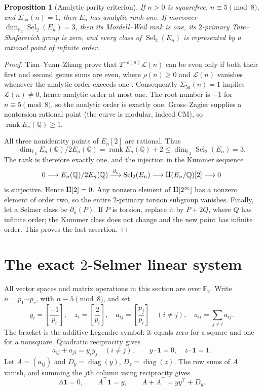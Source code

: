 \documentclass[11pt,a4paper]{article}
\newtheorem{proposition}[theorem]{Proposition}
\theoremstyle{definition}
\newcommand{\FF}{\mathbb F_2}
\newcommand{\QQ}{\mathbb Q}
\newcommand{\rank}{\operatorname{rank}}
\newcommand{\Sel}{\operatorname{Sel}_2}
\newcommand{\Sha}{\operatorname{\mathrlap{\mathchoice{\raisebox{.13ex}{$\displaystyle\amalg$}}{\raisebox{.13ex}{$\textstyle\amalg$}}{\amalg}{\amalg}}\amalg}}
\newcommand{\sgnbit}[2]{\left[\frac{#1}{#2}\right]}
\newcommand{\one}{\boldsymbol{1}}
\newcommand{\diag}{\operatorname{diag}}
\begin{document}
\begin{proposition}[Analytic parity criterion]\label{prop:tyz}
If $n>0$ is squarefree, $n\equiv5\pmod8$, and
$\Sigma_{5a}(n)=1$, then $E_n$ has analytic rank one.
If moreover $\dim_{\FF}\Sel(E_n)=3$, then its Mordell--Weil rank is
one, its $2$-primary Tate--Shafarevich group is zero, and every
class of $\Sel(E_n)$ is represented by a rational point of
infinite order.
\end{proposition}
\begin{proof}
Tian--Yuan--Zhang prove that
$2^{-\rho(n)}\mathcal L(n)$ can be even only if both their
first and second genus sums are even, where $\rho(n)\ge0$ and
$\mathcal L(n)$ vanishes whenever the analytic order exceeds one
\cite[pp.~723--724, Theorem~1.4]{TYZ}.
Consequently $\Sigma_{5a}(n)=1$ implies
$\mathcal L(n)\ne0$, hence analytic order at most one.
The root number is $-1$ for $n\equiv5\pmod8$, so the
analytic order is exactly one.  Gross--Zagier supplies a
nontorsion rational point (the curve is modular, indeed CM),
so $\rank E_n(\QQ)\ge1$.

All three nonidentity points of $E_n[2]$ are rational.  Thus
\[
 \dim_{\FF}E_n(\QQ)/2E_n(\QQ)
        =\rank E_n(\QQ)+2\le\dim_{\FF}\Sel(E_n)=3.
\]
The rank is therefore exactly one, and the injection in the
Kummer sequence
\[
 0\longrightarrow E_n(\QQ)/2E_n(\QQ)
 \overset{\partial_n}{\longrightarrow}\Sel(E_n)
 \longrightarrow \Sha(E_n/\QQ)[2]\longrightarrow0
\]
is surjective.  Hence $\Sha[2]=0$.  Any nonzero element of
$\Sha[2^\infty]$ has a nonzero element of order two, so the
entire $2$-primary torsion subgroup vanishes.
Finally, let a Selmer class be $\partial_n(P)$.
If $P$ is torsion, replace it by $P+2Q$, where $Q$ has
infinite order; the Kummer class does not change and the
new point has infinite order.  This proves the last assertion.
\end{proof}

\section{The exact $2$-Selmer linear system}\label{sec:selmer}

All vector spaces and matrix operations in this section are over
$\FF$.  Write $n=p_1\cdots p_r$, with $n\equiv5\pmod8$,
and set
\[
 y_i=\sgnbit{-1}{p_i},\quad z_i=\sgnbit{2}{p_i},\quad
 a_{ij}=\sgnbit{p_j}{p_i}\quad(i\ne j),\quad
 a_{ii}=\sum_{j\ne i}a_{ij}.
\]
The bracket is the additive Legendre symbol: it equals zero for a
square and one for a nonsquare.  Quadratic reciprocity gives
\begin{equation}\label{eq:reciprocity}
 a_{ij}+a_{ji}=y_i y_j\quad(i\ne j),\qquad
 y\cdot\one=0,\quad z\cdot\one=1.
\end{equation}
Let $A=(a_{ij})$ and $D_y=\diag(y)$, $D_z=\diag(z)$.
The row sums of $A$ vanish, and summing the $j$th column
using reciprocity gives
\begin{equation}\label{eq:Arels}
 A\one=0,\qquad A^\top\one=y,\qquad
 A+A^\top=yy^\top+D_y.
\end{equation}
\end{document}
